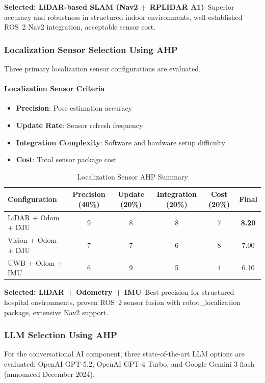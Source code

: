 \textbf{Selected: LiDAR-based SLAM (Nav2 + RPLIDAR A1)}--Superior accuracy and robustness in structured indoor environments, well-established ROS~2 Nav2 integration, acceptable sensor cost.

\subsubsection{Localization Sensor Selection Using AHP}
Three primary localization sensor configurations are evaluated.

\paragraph{Localization Sensor Criteria}
\begin{itemize}
    \item \textbf{Precision}: Pose estimation accuracy
    \item \textbf{Update Rate}: Sensor refresh frequency
    \item \textbf{Integration Complexity}: Software and hardware setup difficulty
    \item \textbf{Cost}: Total sensor package cost
\end{itemize}

\begin{table}[H]
\centering
\caption{Localization Sensor AHP Summary}
\small
\begin{tabular}{lcccc|c}
\toprule
\textbf{Configuration} & \textbf{Precision (40\%)} & \textbf{Update (20\%)} & \textbf{Integration (20\%)} & \textbf{Cost (20\%)} & \textbf{Final} \\
\midrule
LiDAR + Odom + IMU & 9 & 8 & 8 & 7 & \textbf{8.20} \\
Vision + Odom + IMU & 7 & 7 & 6 & 8 & 7.00 \\
UWB + Odom + IMU & 6 & 9 & 5 & 4 & 6.10 \\
\bottomrule
\end{tabular}
\end{table}

\textbf{Selected: LiDAR + Odometry + IMU}--Best precision for structured hospital environments, proven ROS~2 sensor fusion with robot\_localization package, extensive Nav2 support.

\subsubsection{LLM Selection Using AHP}
For the conversational AI component, three state-of-the-art LLM options are evaluated: OpenAI GPT-5.2, OpenAI GPT-4 Turbo, and Google Gemini 3 flash (announced December 2024).

